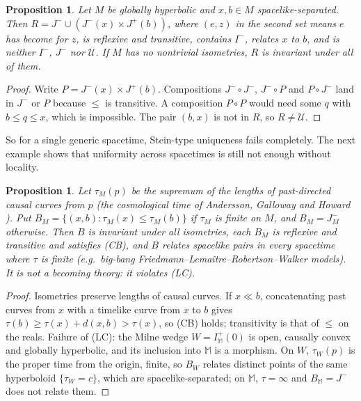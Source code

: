 \documentclass[11pt]{article}
\newtheorem{proposition}[theorem]{Proposition}
\theoremstyle{definition}
\newcommand{\Mink}{\mathbb M}
\newcommand{\U}{\mathcal U}
\newcommand{\Ifut}{I^{+}}
\newcommand{\Ichr}{I^{-}}
\newcommand{\Jp}{J^{+}}
\newcommand{\Jm}{J^{-}}
\begin{document}
\begin{proposition}\label{prop:single}
Let $M$ be globally hyperbolic and $x,b\in M$ spacelike-separated. Then
$R=\Jm\cup(\Jm(x)\times\Jp(b))$, where $(e,z)$ in the second set means $e$
has become for $z$, is reflexive and transitive, contains $\Ichr$, relates $x$
to $b$, and is neither $\Ichr$, $\Jm$ nor $\U$. If $M$ has no nontrivial
isometries, $R$ is invariant under all of them.
\end{proposition}

\begin{proof}
Write $P=\Jm(x)\times\Jp(b)$. Compositions $\Jm\circ\Jm$, $\Jm\circ P$ and
$P\circ\Jm$ land in $\Jm$ or $P$ because $\le$ is transitive. A composition
$P\circ P$ would need some $q$ with $b\le q\le x$, which is impossible. The
pair $(b,x)$ is not in $R$, so $R\neq\U$.
\end{proof}

So for a single generic spacetime, Stein-type uniqueness fails completely. The
next example shows that
uniformity across spacetimes is still not enough without locality.

\begin{proposition}\label{prop:nonlocal}
Let $\tau_M(p)$ be the supremum of the lengths of past-directed causal curves
from $p$ (the cosmological time of Andersson, Galloway and Howard
\citep{AGH1998}). Put $B_M=\{(x,b):\tau_M(x)\le\tau_M(b)\}$ if $\tau_M$ is
finite on $M$, and $B_M=\Jm_M$ otherwise. Then $B$ is invariant under all
isometries, each $B_M$ is
reflexive and transitive and satisfies (CB), and $B$ relates spacelike pairs
in every spacetime where $\tau$ is finite (e.g.\ big-bang
Friedmann--Lemaître--Robertson--Walker models). It is not a becoming theory:
it violates (LC).
\end{proposition}

\begin{proof}
Isometries preserve lengths of causal curves. If $x\ll b$, concatenating
past curves from $x$ with a timelike curve from $x$ to $b$ gives
$\tau(b)\ge\tau(x)+d(x,b)>\tau(x)$, so (CB) holds; transitivity is that of
$\le$ on the reals. Failure of (LC): the Milne wedge $W=\Ifut_\Mink(0)$ is open,
causally convex and globally hyperbolic, and its inclusion into $\Mink$ is a
morphism. On $W$, $\tau_W(p)$ is the proper time from the origin, finite, so
$B_W$ relates distinct points of the same hyperboloid $\{\tau_W=c\}$, which are
spacelike-separated; on $\Mink$, $\tau=\infty$ and $B_\Mink=\Jm$ does not relate
them.
\end{proof}
\end{document}
